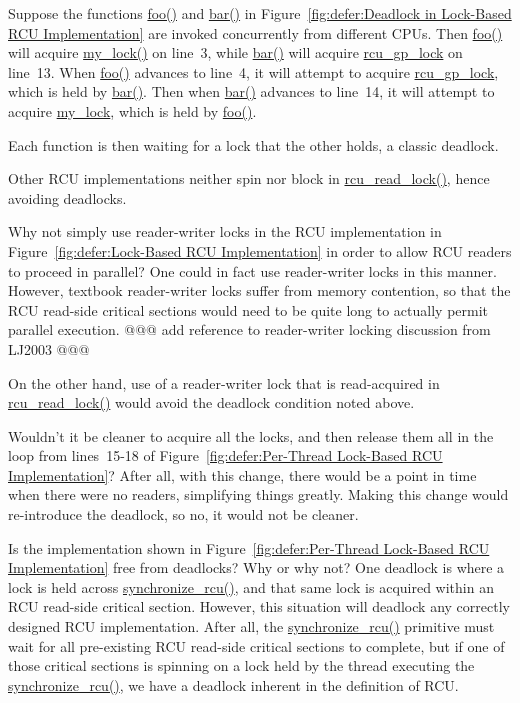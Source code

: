 	Suppose the functions \url{foo()} and \url{bar()} in
	Figure~\ref{fig:defer:Deadlock in Lock-Based RCU Implementation}
	are invoked concurrently from different CPUs.
	Then \url{foo()} will acquire \url{my_lock()} on line~3,
	while \url{bar()} will acquire \url{rcu_gp_lock} on
	line~13.
	When \url{foo()} advances to line~4, it will attempt to
	acquire \url{rcu_gp_lock}, which is held by \url{bar()}.
	Then when \url{bar()} advances to line~14, it will attempt
	to acquire \url{my_lock}, which is held by \url{foo()}.

	Each function is then waiting for a lock that the other
	holds, a classic deadlock.

	Other RCU implementations neither spin nor block in
	\url{rcu_read_lock()}, hence avoiding deadlocks.

\QuickQ{}
	Why not simply use reader-writer locks in the RCU implementation
	in
	Figure~\ref{fig:defer:Lock-Based RCU Implementation}
	in order to allow RCU readers to proceed in parallel?
\QuickA{}
	One could in fact use reader-writer locks in this manner.
	However, textbook reader-writer locks suffer from memory
	contention, so that the RCU read-side critical sections would
	need to be quite long to actually permit parallel execution.
	@@@ add reference to reader-writer locking discussion from LJ2003 @@@

	On the other hand, use of a reader-writer lock that is
	read-acquired in \url{rcu_read_lock()} would avoid the
	deadlock condition noted above.

\QuickQ{}
	Wouldn't it be cleaner to acquire all the locks, and then
	release them all in the loop from lines~15-18 of
	Figure~\ref{fig:defer:Per-Thread Lock-Based RCU Implementation}?
	After all, with this change, there would be a point in time
	when there were no readers, simplifying things greatly.
\QuickA{}
	Making this change would re-introduce the deadlock, so
	no, it would not be cleaner.

\QuickQ{}
	Is the implementation shown in
	Figure~\ref{fig:defer:Per-Thread Lock-Based RCU Implementation}
	free from deadlocks?
	Why or why not?
\QuickA{}
	One deadlock is where a lock is
	held across \url{synchronize_rcu()}, and that same lock is
	acquired within an RCU read-side critical section.
	However, this situation will deadlock any correctly designed
	RCU implementation.
	After all, the \url{synchronize_rcu()} primitive must wait for all
	pre-existing RCU read-side critical sections to complete,
	but if one of those critical sections is spinning on a lock
	held by the thread executing the \url{synchronize_rcu()},
	we have a deadlock inherent in the definition of RCU.

